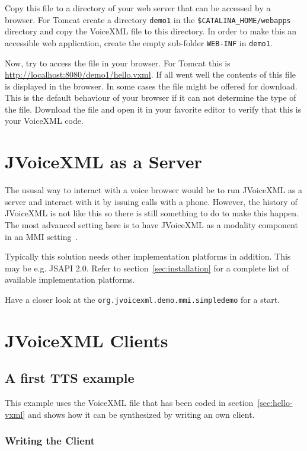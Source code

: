 \documentclass[11pt,a4paper]{book}
\begin{document}
Copy this file to a directory of your web server that can be accessed
by a browser. For Tomcat create a directory \texttt{demo1} in
the \texttt{\$CATALINA\_HOME/webapps} directory and copy the VoiceXML
file to this directory. In order to make this
an accessible web application, create the empty sub-folder \texttt{WEB-INF}
in \texttt{demo1}.

Now, try to access the file in your browser. For Tomcat this is
\url{http://localhost:8080/demo1/hello.vxml}. If all went well the
contents of this file is displayed in the browser. In some cases the file
might be offered for download. This is the default behaviour of your browser if
it can not determine the type of the file. Download the file and open it in your
favorite editor to verify that this is your VoiceXML code.


\chapter{JVoiceXML as a Server}
\label{cha:callmanager}

The ususal way to interact with a voice browser would be to run JVoiceXML as a
server and interact with it by issuing calls with a phone. However, the history
of JVoiceXML is not like this so there is still something to do to make this
happen. The most advanced setting here is to have JVoiceXML as a modality
component in an MMI setting~\cite{w3c:mmi}.

Typically this solution needs other implementation platforms in addition. This
may be e.g. JSAPI 2.0. Refer to section~\ref{sec:installation} for a complete
list of available implementation platforms.

Have a closer look at the \lstinline{org.jvoicexml.demo.mmi.simpledemo} for a
start.

\chapter{JVoiceXML Clients}
\label{cha:programmatic-approach}

\section{A first TTS example}
\label{sec:first-tts-example}

This example uses the VoiceXML file that has been coded in
section~\ref{sec:hello-vxml} and shows how it can be synthesized by writing an
own client. 

\subsection{Writing the Client}
\end{document}
